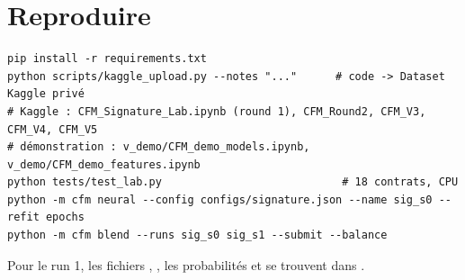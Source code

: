 \section{Reproduire}
\begin{verbatim}
pip install -r requirements.txt
python scripts/kaggle_upload.py --notes "..."      # code -> Dataset Kaggle privé
# Kaggle : CFM_Signature_Lab.ipynb (round 1), CFM_Round2, CFM_V3, CFM_V4, CFM_V5
# démonstration : v_demo/CFM_demo_models.ipynb, v_demo/CFM_demo_features.ipynb
python tests/test_lab.py                            # 18 contrats, CPU
python -m cfm neural --config configs/signature.json --name sig_s0 --refit epochs
python -m cfm blend --runs sig_s0 sig_s1 --submit --balance
\end{verbatim}
\noindent Pour le run 1, les fichiers , , les probabilités  et  se trouvent dans .
